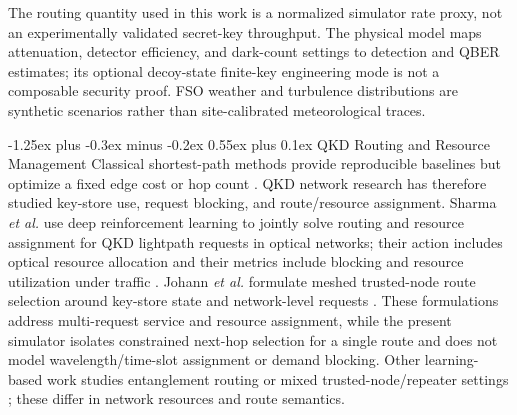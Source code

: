 \documentclass[journal]{IEEEtran}
\makeatletter
\def\subsection{\@startsection{subsection}{2}{\z@}%
  {-1.25ex plus -0.3ex minus -0.2ex}%
  {0.55ex plus 0.1ex}%
  {\normalfont\bfseries\fontsize{10}{12}\selectfont}}
\makeatother
\begin{document}
The routing quantity used in this work is a normalized simulator rate proxy, not an experimentally validated secret-key throughput. The physical model maps attenuation, detector efficiency, and dark-count settings to detection and QBER estimates; its optional decoy-state finite-key engineering mode is not a composable security proof. FSO weather and turbulence distributions are synthetic scenarios rather than site-calibrated meteorological traces.

\subsection{QKD Routing and Resource Management}
Classical shortest-path methods provide reproducible baselines but optimize a fixed edge cost or hop count \cite{dijkstra1959}. QKD network research has therefore studied key-store use, request blocking, and route/resource assignment. Sharma \emph{et al.} use deep reinforcement learning to jointly solve routing and resource assignment for QKD lightpath requests in optical networks; their action includes optical resource allocation and their metrics include blocking and resource utilization under traffic \cite{sharma2023}. Johann \emph{et al.} formulate meshed trusted-node route selection around key-store state and network-level requests \cite{johann2024}. These formulations address multi-request service and resource assignment, while the present simulator isolates constrained next-hop selection for a single route and does not model wavelength/time-slot assignment or demand blocking. Other learning-based work studies entanglement routing or mixed trusted-node/repeater settings \cite{roik2024routing,amer2023dynamic}; these differ in network resources and route semantics.
\end{document}
